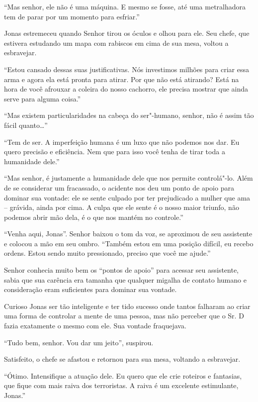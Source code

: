 ``Mas senhor, ele não é uma máquina. E mesmo se fosse, até uma
metralhadora tem de parar por um momento para esfriar.''

Jonas estremeceu quando Senhor  tirou os óculos e olhou para ele. Seu
chefe, que estivera estudando um mapa com rabiscos em cima de sua mesa,
voltou a esbravejar.

``Estou cansado dessas suas justificativas. Nós investimos milhões para
criar essa arma e agora ela está pronta para atirar. Por que não está
atirando? Está na hora de você afrouxar a coleira do nosso cachorro, ele
precisa mostrar que ainda serve para alguma coisa.''

``Mas existem particularidades na cabeça do ser"-humano, senhor, não é
assim tão fácil quanto\ldots{}''

``Tem de ser. A imperfeição humana é um luxo que não podemos nos dar. Eu
quero precisão e eficiência. Nem que para isso você tenha de tirar toda
a humanidade dele.''

``Mas senhor, é justamente a humanidade dele que nos permite
controlá"-lo. Além de se considerar um fracassado, o acidente nos deu um
ponto de apoio para dominar sua vontade: ele se sente culpado por ter
prejudicado a mulher que ama -- grávida, ainda por cima. A culpa que ele
sente é o nosso maior triunfo, não podemos abrir mão dela, é o que nos
mantém no controle.''

``Venha aqui, Jonas''. Senhor  baixou o
tom da voz, se aproximou de seu
assistente e colocou a mão em seu ombro. ``Também estou em uma posição
difícil, eu recebo ordens. Estou sendo muito pressionado, preciso que
você me ajude.''

Senhor  conhecia muito bem os ``pontos de apoio'' para acessar seu
assistente, sabia que sua carência era tamanha que qualquer migalha de
contato humano e consideração eram suficientes para dominar sua vontade.

Curioso Jonas ser tão inteligente e ter tido sucesso onde tantos
falharam ao criar uma forma de controlar a mente de uma pessoa, mas
não perceber que o Sr. D fazia exatamente o mesmo com ele. Sua vontade
fraquejava.

``Tudo bem, senhor. Vou dar um jeito'', suspirou.

Satisfeito, o chefe se afastou e retornou para sua mesa, voltando a
esbravejar.

``Ótimo. Intensifique a atuação dele. Eu quero que
ele crie roteiros e fantasias, que fique com mais raiva dos terroristas.
A raiva é um excelente estimulante, Jonas.''

